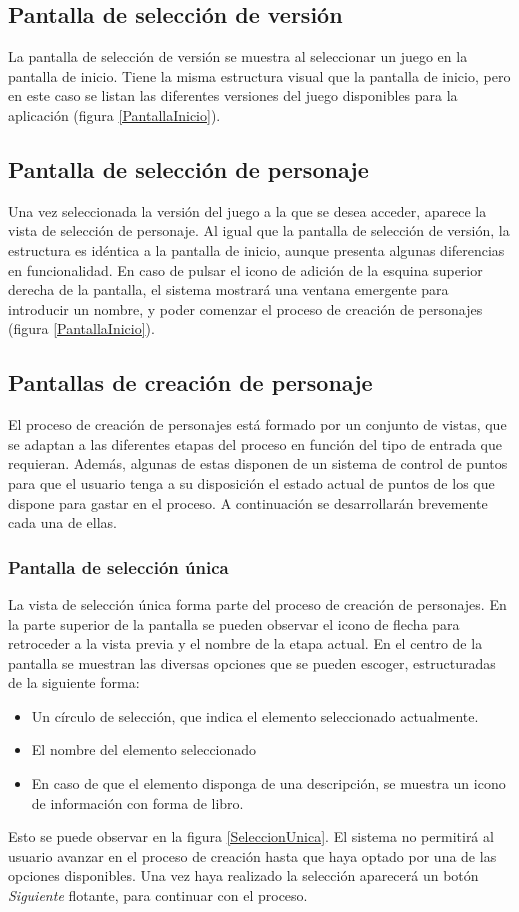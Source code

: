 \subsection{Pantalla de selección de versión}
La pantalla de selección de versión se muestra al seleccionar un juego en la pantalla de inicio.
Tiene la misma estructura visual que la pantalla de inicio, pero en este caso se listan las diferentes versiones 
del juego disponibles para la aplicación (figura \ref*{PantallaInicio}).

\subsection{Pantalla de selección de personaje}
Una vez seleccionada la versión del juego a la que se desea acceder, aparece la vista de selección de personaje.
Al igual que la pantalla de selección de versión, la estructura es idéntica a la pantalla de inicio, aunque presenta 
algunas diferencias en funcionalidad. En caso de pulsar el icono de adición de la esquina superior derecha de la pantalla, 
el sistema mostrará una ventana emergente para introducir un nombre, y poder comenzar el proceso de creación de personajes 
(figura \ref*{PantallaInicio}).

\subsection{Pantallas de creación de personaje}
El proceso de creación de personajes está formado por un conjunto de vistas, que se adaptan a las diferentes etapas del 
proceso en función del tipo de entrada que requieran. Además, algunas de estas disponen de un sistema de control de puntos 
para que el usuario tenga a su disposición el estado actual de puntos de los que dispone para gastar en el proceso.
A continuación se desarrollarán brevemente cada una de ellas.

\subsubsection{Pantalla de selección única}
La vista de selección única forma parte del proceso de creación de personajes. En la parte superior de la 
pantalla se pueden observar el icono de flecha para retroceder a la vista previa y el nombre de la etapa actual.
En el centro de la pantalla se muestran las diversas opciones que se pueden escoger, estructuradas de la siguiente forma:
\begin{itemize}
    \item Un círculo de selección, que indica el elemento seleccionado actualmente.
    \item El nombre del elemento seleccionado
    \item En caso de que el elemento disponga de una descripción, se muestra un icono de información con forma de libro.
\end{itemize}\newpage
Esto se puede observar en la figura \ref*{SeleccionUnica}. El sistema no permitirá al usuario avanzar en el proceso de creación 
hasta que haya optado por una de las opciones disponibles. Una vez haya realizado la selección aparecerá un botón \textit{Siguiente}
flotante, para continuar con el proceso.

